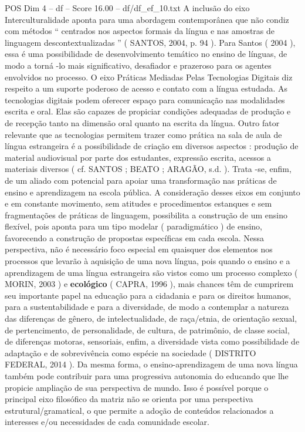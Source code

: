 \begin{textsample}{POS Dim 4 – df – Score 16.00 – df/df\_ef\_10.txt}
A inclusão do eixo Interculturalidade aponta para uma abordagem contemporânea que não condiz com métodos “ centrados nos aspectos formais da língua e nas amostras de linguagem descontextualizadas ” ( SANTOS, 2004, p. 94 ).
Para Santos ( 2004 ), essa é uma possibilidade de desenvolvimento temático no ensino de línguas, de modo a torná -lo mais significativo, desafiador e prazeroso para os agentes envolvidos no processo.
O eixo Práticas Mediadas Pelas Tecnologias Digitais diz respeito a um suporte poderoso de acesso e contato com a língua estudada.
As tecnologias digitais podem oferecer espaço para comunicação nas modalidades escrita e oral.
Elas são capazes de propiciar condições adequadas de produção e de recepção tanto na dimensão oral quanto na escrita da língua.
Outro fator relevante que as tecnologias permitem trazer como prática na sala de aula de língua estrangeira é a possibilidade de criação em diversos aspectos : produção de material audiovisual por parte dos estudantes, expressão escrita, acessos a materiais diversos ( cf.
SANTOS ; BEATO ; ARAGÃO, s.d. ).
Trata -se, enfim, de um aliado com potencial para apoiar uma transformação nas práticas de ensino e aprendizagem na escola pública.
A consideração desses eixos em conjunto e em constante movimento, sem atitudes e procedimentos estanques e sem fragmentações de práticas de linguagem, possibilita a construção de um ensino flexível, pois aponta para um tipo modelar ( paradigmático ) de ensino, favorecendo a construção de propostas específicas em cada escola.
Nessa perspectiva, não é necessário foco especial em quaisquer dos elementos nos processos que levarão à aquisição de uma nova língua, pois quando o ensino e a aprendizagem de uma língua estrangeira são vistos como um processo complexo ( MORIN, 2003 ) e \textbf{ecológico} ( CAPRA, 1996 ), mais chances têm de cumprirem seu importante papel na educação para a cidadania e para os direitos humanos, para a sustentabilidade e para a diversidade, de modo a contemplar a natureza das diferenças de gênero, de intelectualidade, de raça/etnia, de orientação sexual, de pertencimento, de personalidade, de cultura, de patrimônio, de classe social, de diferenças motoras, sensoriais, enfim, a diversidade vista como possibilidade de adaptação e de sobrevivência como espécie na sociedade ( DISTRITO FEDERAL, 2014 ).
Da mesma forma, o ensino-aprendizagem de uma nova língua também pode contribuir para uma progressiva autonomia do educando que lhe propicie ampliação de sua perspectiva de mundo.
Isso é possível porque o principal eixo filosófico da matriz não se orienta por uma perspectiva estrutural/gramatical, o que permite a adoção de conteúdos relacionados a interesses e/ou necessidades de cada comunidade escolar.

\end{textsample}
